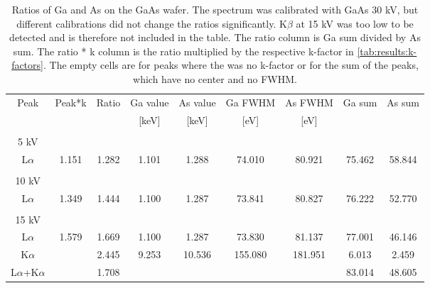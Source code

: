 \begin{table}[ht]
    \centering
    \caption{
        Ratios of Ga and As on the GaAs wafer.
        The spectrum was calibrated with GaAs 30 kV, but different calibrations did not change the ratios significantly.
        K$\beta$ at 15 kV was too low to be detected and is therefore not included in the table.
        The ratio column is Ga sum divided by As sum.
        The ratio * k column is the ratio multiplied by the respective k-factor in \cref{tab:results:k-factors}.
        The empty cells are for peaks where the was no k-factor or for the sum of the peaks, which have no center and no FWHM.
    }
    \label{tab:results:ratios}
    \begin{tabular}{ccccccccc}

        Peak                         & Peak*k & Ratio & Ga value & As value & Ga FWHM & As FWHM & Ga sum  & As sum \\
                                     &        &       & [keV]    & [keV]    & [eV]    & [eV]    &         &        \\
        \hline
                                     &        &       &          &          &         &         &         &        \\

        5 kV                         &        &       &          &          &         &         &         &        \\
        L$\alpha$                    & 1.151  & 1.282 & 1.101    & 1.288    & 74.010  & 80.921  & 75.462  & 58.844 \\
        \hline
                                     &        &       &          &          &         &         &         &        \\
        10 kV                        &        &       &          &          &         &         &         &        \\
        L$\alpha$                    & 1.349  & 1.444 & 1.100    & 1.287    & 73.841  & 80.827  & 76.222  & 52.770 \\

        \hline
                                     &        &       &          &          &         &         &         &        \\
        15 kV                        &        &       &          &          &         &         &         &        \\
        L$\alpha$                    & 1.579  & 1.669 & 1.100    & 1.287    & 73.830  & 81.137  & 77.001  & 46.146 \\
        K$\alpha$                    &        & 2.445 & 9.253    & 10.536   & 155.080 & 181.951 & 6.013   & 2.459  \\
        L$\alpha$+K$\alpha$          &        & 1.708 &          &          &         &         & 83.014  & 48.605 \\


\end{tabular}
\end{table}
